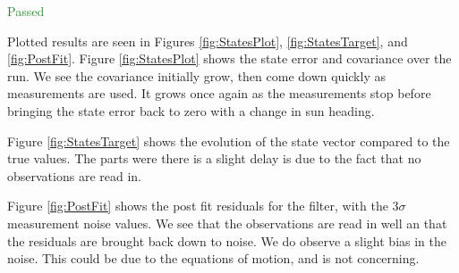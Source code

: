 \documentclass[]{BasiliskReportMemo}
\begin{document}
\textcolor{ForestGreen}{Passed}

Plotted results are seen in Figures \ref{fig:StatesPlot}, \ref{fig:StatesTarget}, and \ref{fig:PostFit}. Figure \ref{fig:StatesPlot} shows the state error and covariance over the run. We see the covariance initially grow, then come down quickly as measurements are used. It grows once again as the measurements stop before bringing the state error back to zero with a change in sun heading. 

Figure \ref{fig:StatesTarget} shows the evolution of the state vector compared to the true values. The parts were there is a slight delay is due to the fact that no observations are read in. 

Figure \ref{fig:PostFit} shows the post fit residuals for the filter, with the $3\sigma$ measurement noise values. We see that the observations are read in well an that the residuals are brought back down to noise. We do observe a slight bias in the noise. This could be due to the equations of motion, and is not concerning.





\end{document}
